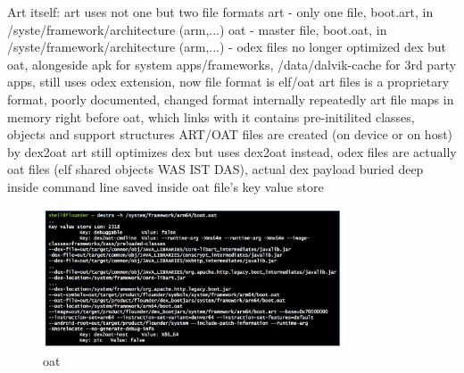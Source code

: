 Art itself:
art uses not one but two file formats
art - only one file, boot.art, in /syste/framework/architecture (arm,...)
oat - master file, boot.oat, in /syste/framework/architecture (arm,...) - odex files no longer optimized dex but oat, alongeside apk for system apps/frameworks, /data/dalvik-cache for 3rd party apps, still uses odex extension, now file format is elf/oat\newline
art files is a proprietary format, poorly documented, changed format internally repeatedly
art file maps in memory right before oat, which links with it
contains pre-initilited classes, objects and support structures\newline
ART/OAT files are created (on device or on host) by dex2oat
art still optimizes dex but uses dex2oat instead, odex files are actually oat files (elf shared objects WAS IST DAS), actual dex payload buried deep inside
command line saved inside oat file's key value store
\begin{figure}[h]
    \centering
    \includegraphics[width=0.8\textwidth]{data/oat.png}
    \caption{oat}
    \label{fig:oat}
\end{figure}
\newline

